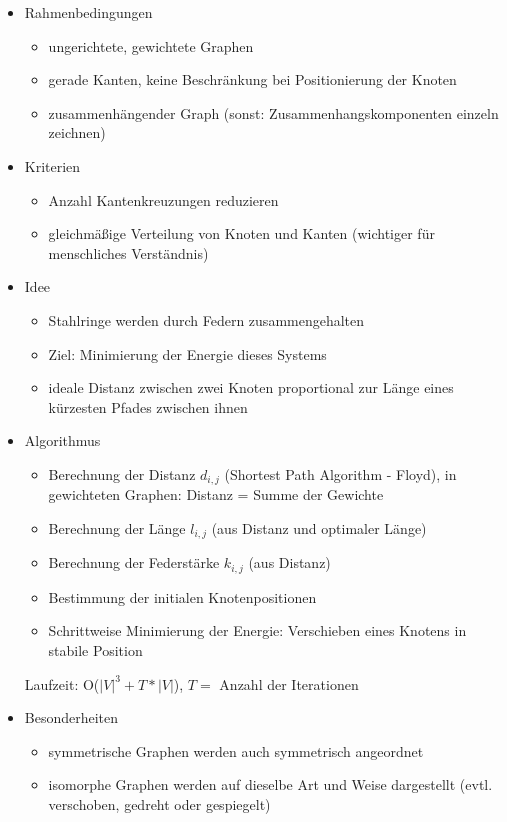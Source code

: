 \documentclass[a4paper,12pt,ngerman]{scrartcl}
\begin{document}
\begin{itemize}
\item Rahmenbedingungen
\begin{itemize}
\item ungerichtete, gewichtete Graphen
\item gerade Kanten, keine Beschränkung bei Positionierung der Knoten
\item zusammenhängender Graph (sonst: Zusammenhangskomponenten einzeln zeichnen)
\end{itemize}
\item Kriterien
\begin{itemize}
\item Anzahl Kantenkreuzungen reduzieren
\item gleichmäßige Verteilung von Knoten und Kanten (wichtiger für menschliches Verständnis)
\end{itemize}
\item Idee
\begin{itemize}
\item Stahlringe werden durch Federn zusammengehalten
\item Ziel: Minimierung der Energie dieses Systems
\item ideale Distanz zwischen zwei Knoten proportional zur Länge eines kürzesten Pfades zwischen ihnen
\end{itemize}
\item Algorithmus
\begin{itemize}
\item Berechnung der Distanz $d_{i,j}$  (Shortest Path Algorithm - Floyd), in gewichteten Graphen: Distanz = Summe der Gewichte
\item Berechnung der Länge $l_{i,j}$ (aus Distanz und optimaler Länge)
\item Berechnung der Federstärke $k_{i,j}$ (aus Distanz)
\item Bestimmung der initialen Knotenpositionen
\item Schrittweise Minimierung der Energie: Verschieben eines Knotens in stabile Position
\end{itemize}

Laufzeit: O($|V|^3 + T * |V|$), $T =$ Anzahl der Iterationen
\item Besonderheiten
\begin{itemize}
\item symmetrische Graphen werden auch symmetrisch angeordnet
\item isomorphe Graphen werden auf dieselbe Art und Weise dargestellt (evtl. verschoben, gedreht oder gespiegelt)
\end{itemize}
\end{itemize}
\end{document}
